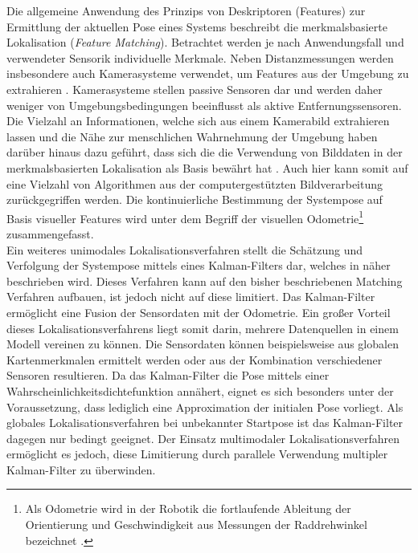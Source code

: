 Die allgemeine Anwendung des Prinzips von Deskriptoren (Features) zur Ermittlung der aktuellen Pose eines Systems beschreibt die merkmalsbasierte Lokalisation (\textit{Feature Matching}). Betrachtet werden je nach Anwendungsfall und verwendeter Sensorik individuelle Merkmale. Neben Distanzmessungen \cite{Tomono2004} werden insbesondere auch Kamerasysteme verwendet, um Features aus der Umgebung zu extrahieren \cite{Se2001}. Kamerasysteme stellen passive Sensoren dar und werden daher weniger von Umgebungsbedingungen beeinflusst als aktive Entfernungssensoren. Die Vielzahl an Informationen, welche sich aus einem Kamerabild extrahieren lassen und die Nähe zur menschlichen Wahrnehmung der Umgebung haben darüber hinaus dazu geführt, dass sich die die Verwendung von Bilddaten in der merkmalsbasierten Lokalisation als Basis bewährt hat \cite{Wolf2002}. Auch hier kann somit auf eine Vielzahl von Algorithmen aus der computergestützten Bildverarbeitung zurückgegriffen werden. Die kontinuierliche Bestimmung der Systempose auf Basis visueller Features wird unter dem Begriff der visuellen Odometrie\footnote{Als Odometrie wird in der Robotik die fortlaufende Ableitung der Orientierung und Geschwindigkeit aus Messungen der Raddrehwinkel bezeichnet \cite{Hertzberg2012}.} \cite{Mccarthy2003} zusammengefasst.\\

Ein weiteres unimodales Lokalisationsverfahren stellt die Schätzung und Verfolgung der Systempose mittels eines Kalman-Filters \cite{Kalman1960} dar, welches in  näher beschrieben wird. Dieses Verfahren kann auf den bisher beschriebenen Matching Verfahren aufbauen, ist jedoch nicht auf diese limitiert. Das Kalman-Filter ermöglicht eine Fusion der Sensordaten mit der Odometrie. Ein großer Vorteil dieses Lokalisationsverfahrens liegt somit darin, mehrere Datenquellen in einem Modell vereinen zu können. Die Sensordaten können beispielsweise aus globalen Kartenmerkmalen ermittelt werden \cite{Leonard1991} oder aus der Kombination verschiedener Sensoren \cite{Roumeliotis1997} resultieren. Da das Kalman-Filter die Pose mittels einer Wahrscheinlichkeitsdichtefunktion annähert, eignet es sich besonders unter der Voraussetzung, dass lediglich eine Approximation der initialen Pose vorliegt. Als globales Lokalisationsverfahren bei unbekannter Startpose ist das Kalman-Filter dagegen nur bedingt geeignet. Der Einsatz multimodaler Lokalisationsverfahren ermöglicht es jedoch, diese Limitierung durch parallele Verwendung multipler Kalman-Filter zu überwinden.

